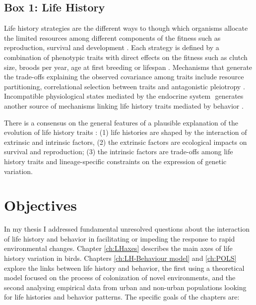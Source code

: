 \begin{small}
\begin{mdframed}
\subsection*{Box 1: Life History}
Life history strategies are the different ways to though which organisms 
allocate the limited resources among different components of the fitness such as 
reproduction, survival and development \citep{stearns1992evolution,roff2002}⁠. 
Each strategy is defined by a combination of phenotypic traits with direct 
effects on the fitness such as clutch size, broods per year, age at first 
breeding or lifespan \citep{Violle2007}⁠.
Mechanisms that generate the trade-offs explaining the observed covariance among 
traits include resource partitioning, correlational selection between traits 
and antagonistic pleiotropy \citep{Roff2007, Stearns1989a}. 
Incompatible physiological states mediated by the endocrine system 
\citep{Ricklefs2002}⁠ generates another source of mechanisms linking life 
history traits mediated by behavior \citep{Reale2010a}.

There is a consensus on the general features of a plausible explanation of the 
evolution of life history traits \citep{Stearns2000}⁠: (1) life histories 
are shaped by the interaction of extrinsic and intrinsic factors, (2) the 
extrinsic factors are ecological impacts on survival and reproduction; (3) the 
intrinsic factors are trade-offs among life history traits and lineage-specific 
constraints on the expression of genetic variation.
\end{mdframed}
\end{small}


\section{Objectives}

In my thesis I addressed fundamental unresolved questions about the 
interaction of life history and behavior in facilitating or impeding the 
response to rapid environmental changes. Chapter \ref{ch:LHaxes} describes the 
main axes of life history variation in birds. Chapters \ref{ch:LH-Behaviour 
model} and \ref{ch:POLS} explore the links between life history and behavior, 
the first using a theoretical model focused on the process of colonization of 
novel environments, and the second analysing empirical data from urban and 
non-urban populations looking for life histories and behavior patterns. The 
specific goals of the chapters are:

